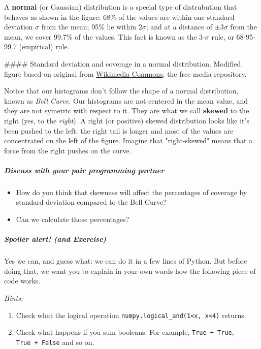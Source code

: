 \documentclass[11pt]{article}
\providecommand{\tightlist}{%
      \setlength{\itemsep}{0pt}\setlength{\parskip}{0pt}}
\begin{document}
A \textbf{normal} (or Gaussian) distribution is a special type of
distrubution that behaves as shown in the figure: 68\% of the values are
within one standard deviation \(\sigma\) from the mean; 95\% lie within
\(2\sigma\); and at a distance of \(\pm3\sigma\) from the mean, we cover
99.7\% of the values. This fact is known as the \(3\)-\(\sigma\) rule,
or 68-95-99.7 (empirical) rule.

 \#\#\#\# Standard deviation and coverage in a normal distribution.
Modified figure based on original from
\href{https://commons.wikimedia.org/wiki/File:Standard_deviation_diagram.svg}{Wikimedia
Commons}, the free media repository.

Notice that our histograms don't follow the shape of a normal
distribution, known as \emph{Bell Curve}. Our histograms are not
centered in the mean value, and they are not symetric with respect to
it. They are what we call \textbf{skewed} to the right (yes, to the
\emph{right}). A right (or positive) skewed distribution looks like it's
been pushed to the left: the right tail is longer and most of the values
are concentrated on the left of the figure. Imagine that "right-skewed"
means that a force from the right pushes on the curve.

    \subparagraph{Discuss with your pair programming
partner}\label{discuss-with-your-pair-programming-partner}

\begin{itemize}
\item
  How do you think that skewness will affect the percentages of coverage
  by standard deviation compared to the Bell Curve?
\item
  Can we calculate those percentages?
\end{itemize}

\subparagraph{Spoiler alert! (and
Exercise)}\label{spoiler-alert-and-exercise}

Yes we can, and guess what: we can do it in a few lines of Python. But
before doing that, we want you to explain in your own words how the
following piece of code works.

\emph{Hints:}

\begin{enumerate}
\def\labelenumi{\arabic{enumi}.}
\tightlist
\item
  Check what the logical operation
  \texttt{numpy.logical\_and(1\textless{}x,\ x\textless{}4)} returns.
\item
  Check what happens if you sum booleans. For example,
  \texttt{True\ +\ True}, \texttt{True\ +\ False} and so on.
\end{enumerate}
\end{document}
